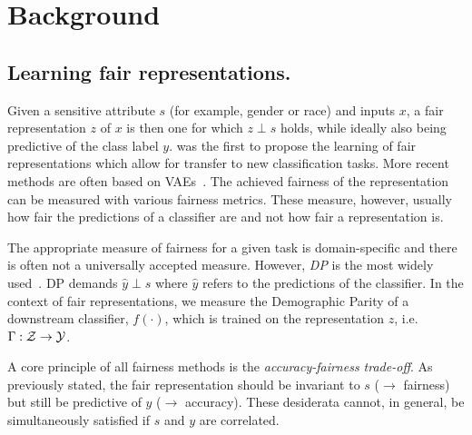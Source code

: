 \section{Background}\label{sec:background}
%
\subsection{Learning fair representations.}
Given a sensitive attribute $s$ (for example, gender or race) and inputs $x$, a fair
representation $z$ of $x$ is then one for which $z \perp s$ holds, while ideally
also being predictive of the class label $y$. 
%
\citet{zemel2013learning} was the first to propose the learning of fair representations which allow
for transfer to new classification tasks.
%
More recent methods are often based on
\acfp{VAE}~\citep{kingma2013auto,louizos2016variational,edwards2016censoring,beutel2017data}. The
achieved fairness of the representation can be measured with various fairness metrics. These
measure, however, usually how fair the predictions of a classifier are and not how fair a
representation is.

The appropriate measure of fairness for a given task is domain-specific \citep{liu2018delayed} and
there is often not a universally accepted measure. 
%
However, \emph{\ac{DP}} is the most widely
used~\citep{louizos2016variational,edwards2016censoring,beutel2017data}. 
%
\ac{DP} demands $\hat{y} \perp s$ where $\hat{y}$ refers to the predictions of the classifier. 
%
In the context of fair representations, we measure the Demographic Parity of a downstream
classifier, $f(\cdot )$, which is trained on the representation $z$, i.e.\  $\Gamma: {\mathcal{Z}} \to {\mathcal{Y}}$.

A core principle of all fairness methods is the \emph{accuracy-fairness trade-off}.
%
As previously stated, the fair representation should be invariant to $s$ ($\to$ fairness) but still
be predictive of $y$ ($\to$ accuracy). These desiderata cannot, in general, be simultaneously
satisfied if $s$ and $y$ are correlated.

